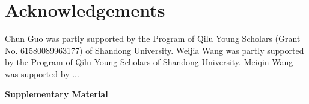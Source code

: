 \documentclass{llncs}
\begin{document}


%













\section*{Acknowledgements}

Chun Guo was partly supported by the Program of Qilu Young Scholars (Grant No. 61580089963177) of Shandong University.
Weijia Wang was partly supported by the Program of Qilu Young Scholars of Shandong University.
Meiqin Wang was supported by ...




\newpage
\begin{center}
\bf\huge Supplementary Material
\end{center}
\vspace{5pt}
\appendix
%

\end{document}
